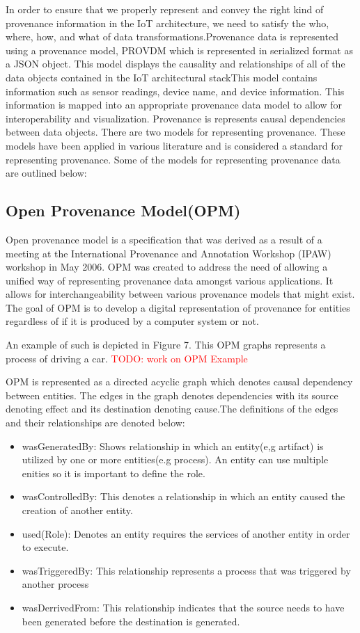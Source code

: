 In order to ensure that we properly represent and convey the right kind of provenance information in the IoT architecture, we need to satisfy the who, where, how, and what of data transformations.Provenance data is represented using a provenance model, PROV\-DM which is represented in serialized format as a JSON object. This model displays the causality and relationships of all of the data objects contained in the IoT architectural stackThis model contains information such as sensor readings, device name, and device information. This information is mapped into an appropriate provenance data model  to allow for interoperability and visualization. Provenance is represents causal dependencies between data objects. There are two models for representing provenance. These models have been applied in various literature and is considered a standard for representing provenance. Some of the models for representing provenance data are outlined below:

\subsection{Open Provenance Model(OPM)}

Open provenance model is a specification that was derived as a result of a meeting at the International Provenance and Annotation Workshop (IPAW) workshop in May 2006. OPM was created to address the need of allowing a unified way of representing provenance data amongst various applications. It allows for interchangeability between various provenance models that might exist. The goal of OPM is to develop a digital representation of provenance for entities regardless of if it is produced by a computer system or not. 

An example of such is depicted in Figure 7. This OPM graphs represents a process of driving a car.  \textcolor{red}{TODO: work on OPM Example}



OPM is represented as a directed acyclic graph which denotes causal dependency between entities. The edges in the graph denotes dependencies with its source denoting effect and its destination denoting cause.The definitions of the edges and their relationships are denoted below: 


\begin{itemize}
\item wasGeneratedBy: Shows relationship in which an entity(e,g artifact) is utilized by one or  more entities(e.g process). An entity can use multiple enities so it is important to define the role.  
\item wasControlledBy: This denotes a relationship in which an entity caused the creation of another entity.
\item used(Role): Denotes an entity requires the services of another entity in order to execute.
\item wasTriggeredBy: This relationship represents a process that was triggered by another process
\item wasDerrivedFrom: This relationship indicates that the source needs to have been generated before the destination is generated.
\end{itemize}

